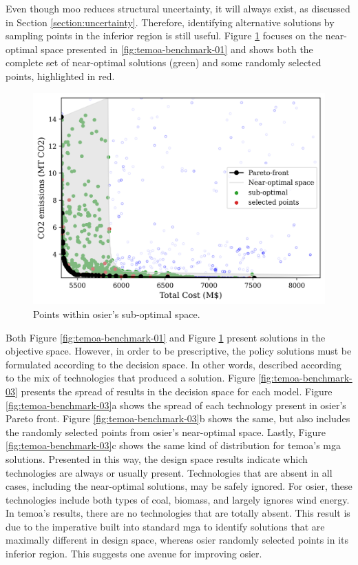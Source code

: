 Even though \ac{moo} reduces structural uncertainty, it will always exist, as
discussed in Section \ref{section:uncertainty}. Therefore, identifying
alternative solutions by sampling points in the inferior region is still useful.
Figure \ref{fig:temoa-benchmark-02} focuses on the near-optimal space presented
in \ref{fig:temoa-benchmark-01} and shows both the complete set of near-optimal
solutions (green) and some randomly selected points, highlighted in red.

\begin{figure}[h]
  \centering
  \includegraphics[width=0.6\columnwidth]{figures/results/osier_mga_subset_01.png}
  \caption{Points within \ac{osier}'s sub-optimal space.}
  \label{fig:temoa-benchmark-02}
\end{figure}

Both Figure \ref{fig:temoa-benchmark-01} and Figure \ref{fig:temoa-benchmark-02}
present solutions in the objective space. However, in order to be prescriptive,
the policy solutions must be formulated according to the decision space. In
other words, described according to the mix of technologies that produced a
solution. Figure \ref{fig:temoa-benchmark-03} presents the spread of results in
the decision space for each model. Figure \ref{fig:temoa-benchmark-03}a shows
the spread of each technology present in \ac{osier}'s Pareto front. Figure
\ref{fig:temoa-benchmark-03}b shows the same, but also includes the randomly
selected points from \ac{osier}'s near-optimal space. Lastly, Figure
\ref{fig:temoa-benchmark-03}c shows the same kind of distribution for
\ac{temoa}'s \ac{mga} solutions. Presented in this way, the design space results
indicate which technologies are always or usually present. Technologies that are
absent in all cases, including the near-optimal solutions, may be safely
ignored. For \ac{osier}, these technologies include both types of coal, biomass,
and largely ignores wind energy. In \ac{temoa}'s results, there are no
technologies that are totally absent. This result is due to the imperative built
into standard \ac{mga} to identify solutions that are maximally different in
design space, whereas \ac{osier} randomly selected points in its inferior
region. This suggests one avenue for improving \ac{osier}.

